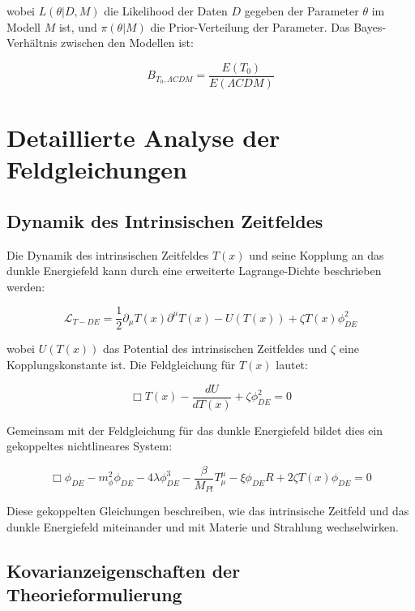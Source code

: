 \documentclass[a4paper,12pt]{article}
\theoremstyle{definition}
\theoremstyle{remark}
\newcommand{\Tfield}{T(x)} %
\begin{document}
	wobei $L(\theta|D,M)$ die Likelihood der Daten $D$ gegeben der Parameter $\theta$ im Modell $M$ ist, und $\pi(\theta|M)$ die Prior-Verteilung der Parameter. Das Bayes-Verhältnis zwischen den Modellen ist:
	
	\begin{equation}
		B_{T_0,\Lambda CDM} = \frac{E(T_0)}{E(\Lambda CDM)}
	\end{equation}
	
	\section{Detaillierte Analyse der Feldgleichungen}
	
	\subsection{Dynamik des Intrinsischen Zeitfeldes}
	
	Die Dynamik des intrinsischen Zeitfeldes $\Tfield$ und seine Kopplung an das dunkle Energiefeld kann durch eine erweiterte Lagrange-Dichte beschrieben werden:
	
	\begin{equation}
		\mathcal{L}_{T-DE} = \frac{1}{2}\partial_\mu \Tfield \partial^\mu \Tfield - U(\Tfield) + \zeta \Tfield \phi_{DE}^2
	\end{equation}
	
	wobei $U(\Tfield)$ das Potential des intrinsischen Zeitfeldes und $\zeta$ eine Kopplungskonstante ist. Die Feldgleichung für $\Tfield$ lautet:
	
	\begin{equation}
		\Box \Tfield - \frac{dU}{d\Tfield} + \zeta \phi_{DE}^2 = 0
	\end{equation}
	
	Gemeinsam mit der Feldgleichung für das dunkle Energiefeld bildet dies ein gekoppeltes nichtlineares System:
	
	\begin{equation}
		\Box\phi_{DE} - m_{\phi}^2\phi_{DE} - 4\lambda\phi_{DE}^3 - \frac{\beta}{M_{Pl}}T^{\mu}_{\mu} - \xi \phi_{DE} R + 2\zeta \Tfield \phi_{DE} = 0
	\end{equation}
	
	Diese gekoppelten Gleichungen beschreiben, wie das intrinsische Zeitfeld und das dunkle Energiefeld miteinander und mit Materie und Strahlung wechselwirken.
	
	\subsection{Kovarianzeigenschaften der Theorieformulierung}
	
\end{document}
